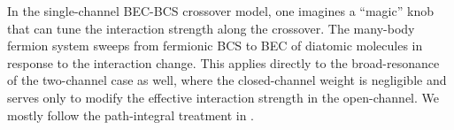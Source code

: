 In the single-channel BEC-BCS crossover model, one imagines a ``magic'' knob that can tune the interaction strength along the crossover.  The many-body fermion  system sweeps from fermionic BCS to BEC of diatomic molecules  in response to the interaction change.   This applies directly to the broad-resonance of the two-channel case as well, where the closed-channel weight is negligible and serves only to modify the effective interaction strength in the open-channel.  We mostly follow the path-integral treatment in \cite{RanderiaBEC, Randeria1997, Randeria2008}.




\begin{subappendices}
\end{subappendices}

